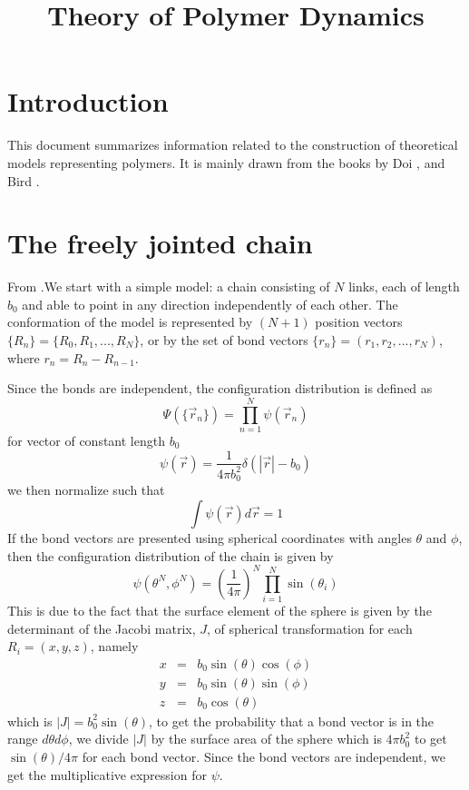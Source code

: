 \documentclass{paper}
\begin{document}
\title{Theory of Polymer Dynamics}
\maketitle
\section{Introduction}
This document summarizes information related to the construction of theoretical models representing polymers. 
It is mainly drawn from the books by Doi \cite{doi1986theory}\cite{doi1996introduction}, and Bird \cite{bird1987dynamics}. 
 
\section{The freely jointed chain}\label{section_theFreelyJointedChain}
From \cite{doi1986theory}.We start with a simple model: a chain consisting of $N$ links, each of length $b_0$ and able to point in any direction independently of each other. The conformation of the model is represented by $(N+1)$ position vectors $\{R_n\}=\{R_0,R_1,...,R_{N}\}$, or by the set of bond vectors $\{r_n\}=(r_1,r_2,...,r_N)$, where $r_n=R_{n}-R_{n-1}$. 

Since the bonds are independent, the configuration distribution is defined as 
\begin{equation*} 
\Psi(\{\vec{r}_n\})=\prod_{n=1}^N\psi(\vec{r}_n)
\end{equation*}
for vector of constant length $b_0$
\begin{equation*}
\psi(\vec{r})=\frac{1}{4\pi b_0^2}\delta(|\vec{r}|-b_0)
\end{equation*}
we then normalize such that 
\begin{equation*}
\int \psi(\vec{r})d\vec{r} =1
\end{equation*}
If the bond vectors are presented using spherical coordinates with angles $\theta$ and $\phi$, then the configuration distribution of the chain is given by 
\begin{equation*}
\psi(\theta^{N},\phi^{N})=\left(\frac{1}{4\pi}\right)^{N} \prod_{i=1}^{N}\sin(\theta_i)
\end{equation*}
This is due to the fact that the surface element of the sphere is given by the determinant of the Jacobi matrix, $J$, of spherical transformation for each $R_i=(x,y,z)$, namely
\begin{eqnarray*}
x &=& b_0\sin(\theta)\cos(\phi)\\
y &=& b_0\sin(\theta)\sin(\phi)\\
z &=& b_0\cos(\theta) 
\end{eqnarray*} 
which is $|J|=b_0^2\sin(\theta)$, to get the probability that a bond vector is in the range $d\theta d\phi$, we divide $|J|$ by the surface area of the sphere which is $4\pi b_0^2$ to get $\sin(\theta)/4\pi$ for each bond vector. Since the bond vectors are independent, we get the multiplicative expression for $\psi$.
 
\end{document}
